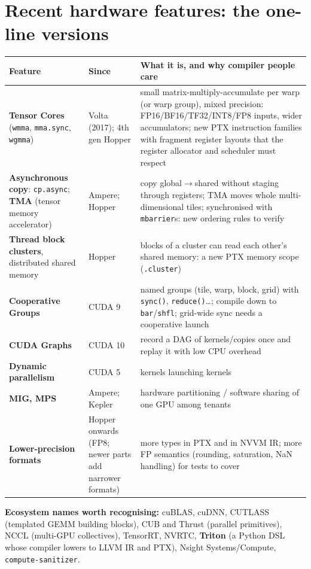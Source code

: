 \documentclass[10pt,a4paper,openany,oneside]{report}
\newcommand{\prio}[1]{\texorpdfstring{\ifcase#1\or{\color{gold}\ding{72}}\or{\color{gold}\ding{72}\ding{72}}\or{\color{gold}\ding{72}\ding{72}\ding{72}}\fi}{}}
\begin{document}
\section{Recent hardware features: the one-line versions \prio{1}}
\begin{center}\small
\begin{xltabular}{\textwidth}{@{}L{3.3cm}L{2.5cm}Y@{}}
\toprule
\textbf{Feature} & \textbf{Since} & \textbf{What it is, and why compiler people care}\\
\midrule\endhead
\textbf{Tensor Cores} (\texttt{wmma}, \texttt{mma.sync}, \texttt{wgmma}) & Volta (2017); 4th gen Hopper & small matrix-multiply-accumulate per warp (or warp group), mixed precision: FP16/BF16/TF32/INT8/FP8 inputs, wider accumulators; new PTX instruction families with fragment register layouts that the register allocator and scheduler must respect\\
\textbf{Asynchronous copy}: \texttt{cp.async}; \textbf{TMA} (tensor memory accelerator) & Ampere; Hopper & copy global$\to$shared without staging through registers; TMA moves whole multi-dimensional tiles; synchronised with \texttt{mbarrier}s: new ordering rules to verify\\
\textbf{Thread block clusters}, distributed shared memory & Hopper & blocks of a cluster can read each other's shared memory: a new PTX memory scope (\texttt{.cluster})\\
\textbf{Cooperative Groups} & CUDA 9 & named groups (tile, warp, block, grid) with \texttt{sync()}, \texttt{reduce()}\ldots; compile down to \texttt{bar}/\texttt{shfl}; grid-wide sync needs a cooperative launch\\
\textbf{CUDA Graphs} & CUDA 10 & record a DAG of kernels/copies once and replay it with low CPU overhead\\
\textbf{Dynamic parallelism} & CUDA 5 & kernels launching kernels\\
\textbf{MIG, MPS} & Ampere; Kepler & hardware partitioning / software sharing of one GPU among tenants\\
\textbf{Lower-precision formats} & Hopper onwards (FP8; newer parts add narrower formats) & more types in PTX and in NVVM IR; more FP semantics (rounding, saturation, NaN handling) for tests to cover\\
\bottomrule
\end{xltabular}
\end{center}
\textbf{Ecosystem names worth recognising:} cuBLAS, cuDNN, CUTLASS (templated GEMM building blocks), CUB and Thrust (parallel primitives), NCCL (multi-GPU collectives), TensorRT, NVRTC, \textbf{Triton} (a Python DSL whose compiler lowers to LLVM IR and PTX), Nsight Systems/Compute, \texttt{compute-sanitizer}.
\end{document}
